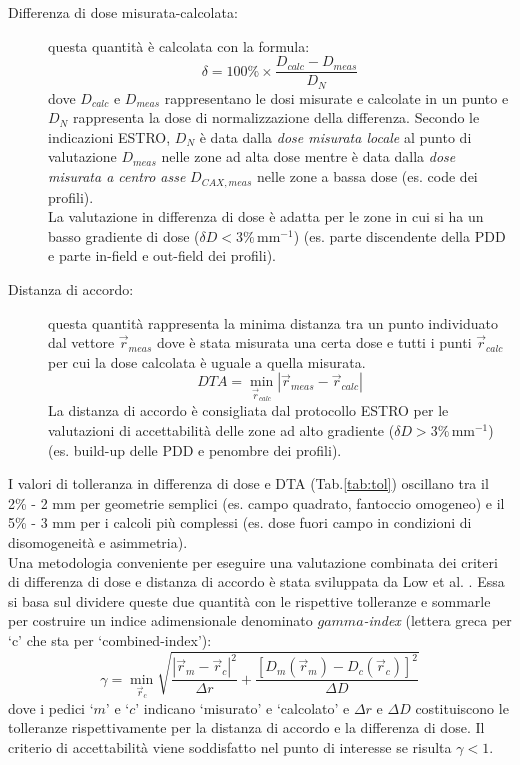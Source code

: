 \begin{description}

\item[Differenza di dose misurata-calcolata:] questa quantità è calcolata con la formula:
\begin{equation}
\delta = 100\% \times \frac{D_{calc} - D_{meas}}{D_{N}}
\end{equation}
dove $D_{calc}$ e $D_{meas}$ rappresentano le dosi misurate e calcolate in un punto e $D_N$ rappresenta la dose di normalizzazione della differenza. Secondo le indicazioni ESTRO, $D_N$ è data dalla \textit{dose misurata locale} al punto di valutazione $D_{meas}$ nelle zone ad alta dose mentre è data dalla \textit{dose misurata a centro asse}  $D_{CAX,meas}$ nelle zone a bassa dose (es. code dei profili).\\
La valutazione in differenza di dose è adatta per le zone in cui si ha un basso gradiente di dose ($\delta D < 3\%\,$mm$^{-1}$) (es. parte discendente della PDD e parte in-field e out-field dei profili).

\item[Distanza di accordo:] questa quantità rappresenta la minima distanza tra un punto individuato dal vettore $\vec{r}_{meas}$ dove è stata misurata una certa dose e tutti i punti $\vec{r}_{calc}$ per cui la dose calcolata è  uguale a quella misurata.
\begin{equation}
DTA = \min_{\vec{r}_{calc}} \left|\vec{r}_{meas} - \vec{r}_{calc}\right|
\end{equation}
La distanza di accordo è consigliata dal protocollo ESTRO per le valutazioni di accettabilità delle zone ad alto gradiente ($\delta D > 3\%\,$mm$^{-1}$) (es. build-up delle PDD e penombre dei profili).
\end{description}

I valori di tolleranza in differenza di dose e DTA (Tab.\ref{tab:tol}) oscillano tra il 2\% - 2 mm per geometrie semplici (es. campo quadrato, fantoccio omogeneo) e il 5\% - 3 mm per i calcoli più complessi (es. dose fuori campo in condizioni di disomogeneità e asimmetria).\\
Una metodologia conveniente per eseguire una valutazione combinata dei criteri di differenza di dose e distanza di accordo è stata sviluppata da Low et al. \cite{Low1998}. Essa si basa sul dividere queste due quantità con le rispettive tolleranze e sommarle per costruire un indice adimensionale denominato \textit{$gamma$-index} (lettera greca per `c' che sta per `combined-index'):
\begin{equation}
\gamma = \min_{\vec{r}_{c}} \sqrt{\frac{|\vec{r}_{m}-\vec{r}_{c}|^2}{\Delta r}   + \frac{\left[D_{m}(\vec{r}_{m})-D_{c}(\vec{r}_{c})\right]^2}{\Delta D} }
\end{equation}
dove i pedici `$m$' e `$c$' indicano `misurato' e `calcolato' e $\Delta r$ e $\Delta D$ costituiscono le tolleranze rispettivamente per la distanza di accordo e la differenza di dose. Il criterio di accettabilità viene soddisfatto nel punto di interesse se risulta $\gamma < 1$.

